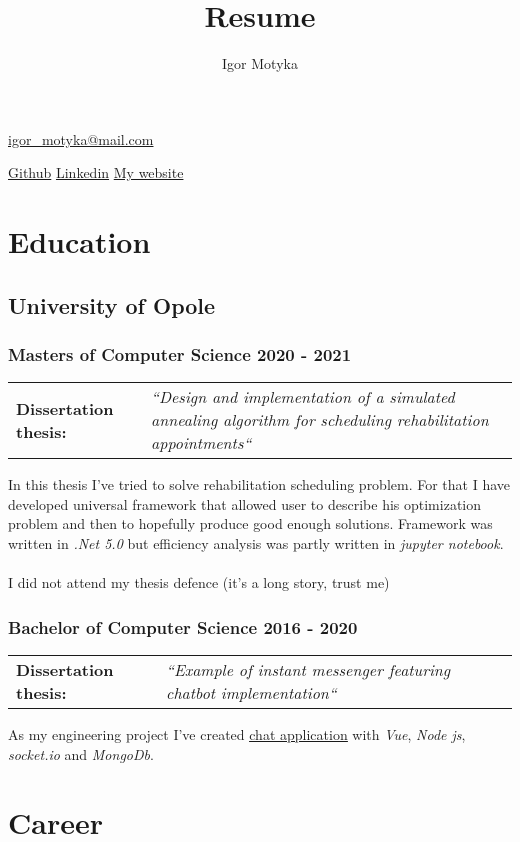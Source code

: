 \documentclass[10pt]{article}
\author{Igor Motyka}
\title{Resume}
\makeatletter
\renewcommand{\maketitle}{
 \begin{center}
    \huge\bfseries\theauthor
 \end{center}
 \begin{center}
    \href{mailto:igor\_motyka@mail.com}{igor\_motyka@mail.com}\\
 \end{center}
 \begin{center}
	 \href{https://github.com/Anav0}{Github} \hspace{0.7cm} \href{https://www.linkedin.com/in/igor-m-873439168/}{Linkedin} \hspace{0.7cm} \href{https://igormotyka.netlify.app/}{My website}
 \end{center}
 }
\makeatother
\begin{document}
\maketitle

\section{Education}
\subsection{University of Opole}
\subsubsection{Masters of Computer Science 2020 - 2021}
\begin{table}[H]
    \begin{tabularx}{\textwidth}{@{}l X}
     \textbf{Dissertation thesis:} & \textit{``Design and implementation of a simulated annealing algorithm for scheduling rehabilitation appointments``} \\
    \end{tabularx}
\end{table}
\noindent In this thesis I've tried to solve rehabilitation scheduling problem. For that I have developed universal framework that allowed user to describe his optimization problem and then to hopefully produce good enough solutions. Framework was written in \emph{.Net 5.0} but efficiency analysis was partly written in \emph{jupyter notebook}.
\\\\
I did not attend my thesis defence (it's a long story, trust me)
\subsubsection{Bachelor of Computer Science 2016 - 2020}
\begin{table}[H]
    \begin{tabularx}{\textwidth}{@{}l X}
    \textbf{Dissertation thesis:} &  \textit{``Example of instant messenger featuring chatbot implementation``}\\
    \end{tabularx}
\end{table}
\noindent As my engineering project I've created \href{https://www.behance.net/gallery/91600605/Gymba-chat}{\underline{chat application}} with \emph{Vue}, \emph{Node js}, \emph{socket.io} and \emph{MongoDb}.
\section{Career}
\end{document}

